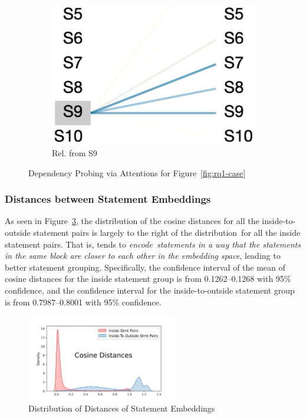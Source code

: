 \begin{figure}
\begin{subfigure}[b]{0.15\textwidth}
         \includegraphics[width=\textwidth]{sec9-fig3.png}
         \caption{Rel. from S9}
         \label{fig:stmt-9}
     \end{subfigure}
     \vspace{-9pt}
        \caption{Dependency Probing via Attentions for Figure~\ref{fig:rq1-case}}
        \label{fig:rq4-attention}
\end{figure}


\subsubsection{Distances between Statement Embeddings}

As seen in Figure~\ref{fig:rq4-density}, the distribution of the
cosine distances for all the inside-to-outside statement pairs is
largely to the right of the distribution~for all the inside statement
pairs. That is, {\tool} tends to {\em encode~statements in a way that
  the statements in the same  block are closer to each other
  in the embedding space}, leading to better statement grouping.
Specifically, the confidence interval of the mean of cosine distances
for the inside statement group is from 0.1262--0.1268 with 95\%
confidence, and the confidence interval for the inside-to-outside
statement group is from 0.7987--0.8001 with 95\% confidence.

\begin{figure}[t]
 	\centering
 	\includegraphics[width=2.6in]{rq4-density-v2.png}
        \vspace{-12pt}
 	\caption{Distribution of Distances of Statement Embeddings}
 	\label{fig:rq4-density}	
\end{figure}




